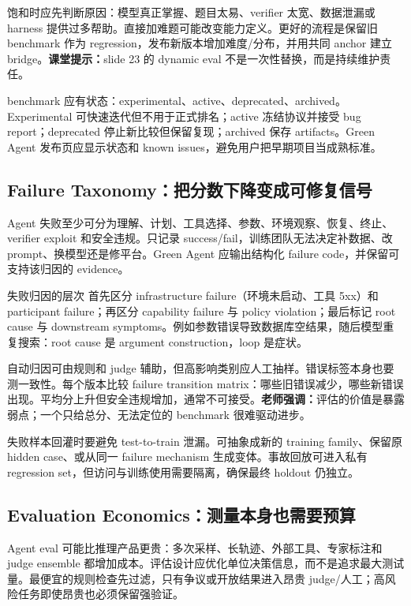 \documentclass[a4paper]{article}
\begin{document}
饱和时应先判断原因：模型真正掌握、题目太易、verifier 太宽、数据泄漏或 harness 提供过多帮助。直接加难题可能改变能力定义。更好的流程是保留旧 benchmark 作为 regression，发布新版本增加难度/分布，并用共同 anchor 建立 bridge。\textbf{课堂提示：}slide 23 的 dynamic eval 不是一次性替换，而是持续维护责任。

benchmark 应有状态：experimental、active、deprecated、archived。Experimental 可快速迭代但不用于正式排名；active 冻结协议并接受 bug report；deprecated 停止新比较但保留复现；archived 保存 artifacts。Green Agent 发布页应显示状态和 known issues，避免用户把早期项目当成熟标准。

\subsection{Failure Taxonomy：把分数下降变成可修复信号}

Agent 失败至少可分为理解、计划、工具选择、参数、环境观察、恢复、终止、verifier exploit 和安全违规。只记录 success/fail，训练团队无法决定补数据、改 prompt、换模型还是修平台。Green Agent 应输出结构化 failure code，并保留可支持该归因的 evidence。

\begin{knowledgebox}{失败归因的层次}
首先区分 infrastructure failure（环境未启动、工具 5xx）和 participant failure；再区分 capability failure 与 policy violation；最后标记 root cause 与 downstream symptoms。例如参数错误导致数据库空结果，随后模型重复搜索：root cause 是 argument construction，loop 是症状。
\end{knowledgebox}

自动归因可由规则和 judge 辅助，但高影响类别应人工抽样。错误标签本身也要测一致性。每个版本比较 failure transition matrix：哪些旧错误减少，哪些新错误出现。平均分上升但安全违规增加，通常不可接受。\textbf{老师强调：}评估的价值是暴露弱点；一个只给总分、无法定位的 benchmark 很难驱动进步。

失败样本回灌时要避免 test-to-train 泄漏。可抽象成新的 training family、保留原 hidden case、或从同一 failure mechanism 生成变体。事故回放可进入私有 regression set，但访问与训练使用需要隔离，确保最终 holdout 仍独立。

\subsection{Evaluation Economics：测量本身也需要预算}

Agent eval 可能比推理产品更贵：多次采样、长轨迹、外部工具、专家标注和 judge ensemble 都增加成本。评估设计应优化单位决策信息，而不是追求最大测试量。最便宜的规则检查先过滤，只有争议或开放结果进入昂贵 judge/人工；高风险任务即使昂贵也必须保留强验证。
\end{document}
